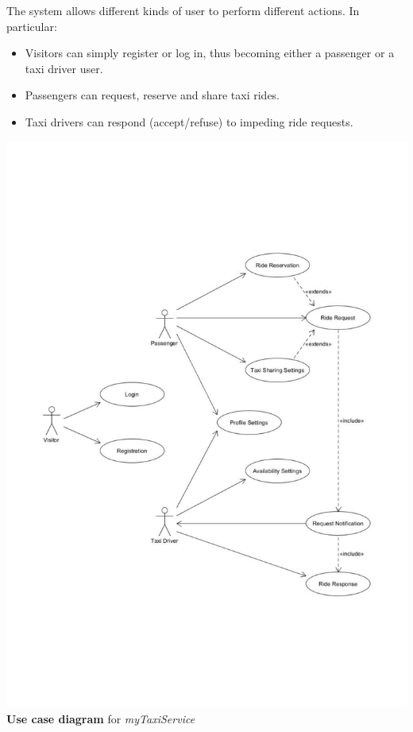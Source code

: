 The system allows different kinds of user to perform different actions. In particular:
\begin{itemize}
  \item Visitors can simply register or log in, thus becoming either a passenger or a taxi driver user.
  \item Passengers can request, reserve and share taxi rides.
  \item Taxi drivers can respond (accept/refuse) to impeding ride requests.
\end{itemize}

\begin{center}
	\includegraphics[width=\textwidth]{diagrams/global_use_case}
	{\bf Use case diagram} for {\it myTaxiService}
\end{center}

